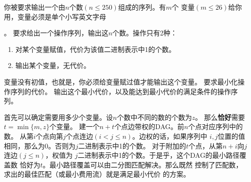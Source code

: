\begin{prob}
	你被要求输出一个由$n$个数$(n\le 250)$组成的序列。有$m$个
	变量$(m\le 26)$给你用，变量必须是单个小写英文字母 \par。
	要求给出一个操作序列，输出这$n$个数。操作只有2种：
	\begin{enumerate}
		\item 对某个变量赋值，代价为该值二进制表示中1的个数。
		\item 输出某个变量，无代价。
	\end{enumerate}
	变量没有初值，也就是，你必须给变量赋过值才能输出这个变量。
	要求最小化操作序列的代价。 输出这个最小代价，以及能达到最小代价的满足条件的操作序列。
\end{prob}

\begin{sol}
	首先可以确定需要用多少个变量。设$n$个数中不同的数的个数为$z$。
	那么\textbf{恰好}需要$t = \min \{ m, z\}$个变量。
	建一个$n+t$个点边带权的DAG。前$n$个点对应序列中的数。
	从第$i$个点向第$j$个点连边$(i < j \le n)$。边权的话，如果序列中
	$i,j$位置的值相同，那么为0。否则为$j$二进制表示中1的个数。
	对于附加的$t$个点，从第$n+i$向$j$连边$(j \le n)$，权值为
	$j$二进制表示中1的个数。于是乎，这个DAG的最小路径覆盖数
	恰好为$t$。最小路径覆盖可以由二分图匹配解决。那么既然
	控制了匹配数，求出的最佳匹配（或最小费用流）就是满足最小代价
	的方案。
\end{sol}

